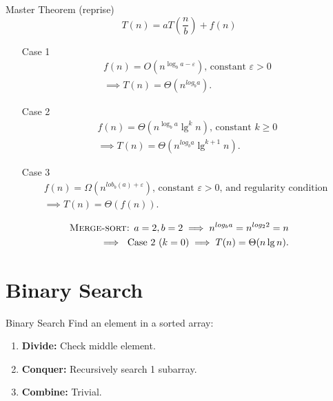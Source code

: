 \documentclass{beamer}
\begin{document}
\begin{frame}{Master Theorem (reprise)}
    \small
    $$
        T(n) = aT\left(\frac{n}{b}\right) + f(n)
    $$
    \begin{itemize}
        \vspace{-5mm}
        \item[Case 1]
            \begin{align*}
                f(n) = O\left(n^{\log_b a - \varepsilon} \right) \text{, constant }\varepsilon > 0 \\ \implies T(n) = \Theta(n^{log_b a}) \text{.}
            \end{align*}
        \vspace{-5mm}
        \item[Case 2]
            \begin{align*}
                f(n) = \Theta\left(n^{\log_b a}\lg^k n \right) \text{, constant }k \geq 0 \\ \implies T(n) = \Theta(n^{log_b a}\lg^{k + 1} n) \text{.}
            \end{align*}
        \vspace{-5mm}
        \item[Case 3]
            \begin{align*}
                f(n) = \Omega\left(n^{lob_b(a) + \varepsilon} \right) \text{, constant }\varepsilon > 0 \text{, and regularity condition } \\ \implies T(n) = \Theta(f(n)) \text{.}
            \end{align*}
    \end{itemize}
    \begin{align*}
        \text{\textsc{Merge-sort:} } a = 2, b = 2 \implies n^{log_b a} = n^{log_2 2} = n \\ \implies \text{ Case 2 } (k = 0) \implies T(n) = \Theta(n \lg n) \text{.}
    \end{align*}
\end{frame}


\section{Binary Search}

\begin{frame}{Binary Search}
    Find an element in a sorted array:
    \begin{enumerate}
        \item \textbf{\Large Divide:} Check middle element.
        \item \textbf{\Large Conquer:} Recursively search 1 subarray.
        \item \textbf{\Large Combine:} Trivial.
    \end{enumerate}
\end{frame}
\end{document}
